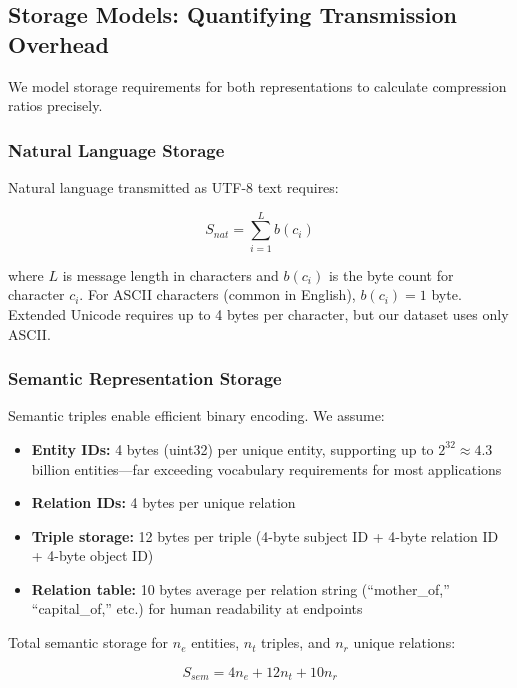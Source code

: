 \documentclass[conference]{IEEEtran}
\begin{document}
\subsection{Storage Models: Quantifying Transmission Overhead}

We model storage requirements for both representations to calculate 
compression ratios precisely.

\subsubsection{Natural Language Storage}

Natural language transmitted as UTF-8 text requires:

\begin{equation}
S_{nat} = \sum_{i=1}^{L} b(c_i)
\label{eq:natural_storage}
\end{equation}

where $L$ is message length in characters and $b(c_i)$ is the byte count 
for character $c_i$. For ASCII characters (common in English), $b(c_i) = 1$ 
byte. Extended Unicode requires up to 4 bytes per character, but our 
dataset uses only ASCII.

\subsubsection{Semantic Representation Storage}

Semantic triples enable efficient binary encoding. We assume:

\begin{itemize}
\item \textbf{Entity IDs:} 4 bytes (uint32) per unique entity, supporting 
      up to $2^{32} \approx 4.3$ billion entities—far exceeding vocabulary 
      requirements for most applications
\item \textbf{Relation IDs:} 4 bytes per unique relation
\item \textbf{Triple storage:} 12 bytes per triple (4-byte subject ID + 
      4-byte relation ID + 4-byte object ID)
\item \textbf{Relation table:} 10 bytes average per relation string 
      (``mother\_of,'' ``capital\_of,'' etc.) for human readability at 
      endpoints
\end{itemize}

Total semantic storage for $n_e$ entities, $n_t$ triples, and $n_r$ 
unique relations:

\begin{equation}
S_{sem} = 4n_e + 12n_t + 10n_r
\label{eq:storage}
\end{equation}
\end{document}
